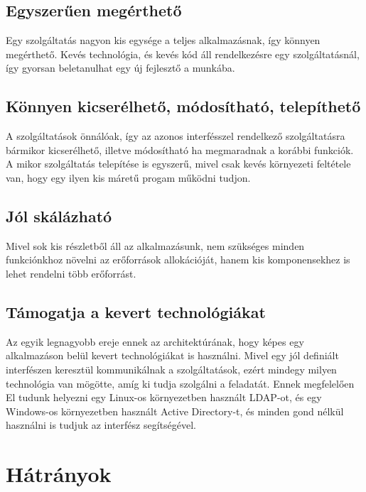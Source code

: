 \documentclass[11pt,magyar,a4paper,oneside,]{report}
\begin{document}
\subsection{Egyszerűen
megérthető}\label{egyszerux171en-meguxe9rthetux151}

Egy szolgáltatás nagyon kis egysége a teljes alkalmazásnak, így könnyen
megérthető. Kevés technológia, és kevés kód áll rendelkezésre egy
szolgáltatásnál, így gyorsan beletanulhat egy új fejlesztő a munkába.

\subsection{Könnyen kicserélhető, módosítható,
telepíthető}\label{kuxf6nnyen-kicseruxe9lhetux151-muxf3dosuxedthatuxf3-telepuxedthetux151}

A szolgáltatások önnálóak, így az azonos interfésszel rendelkező
szolgáltatásra bármikor kicserélhető, illetve módosítható ha megmaradnak
a korábbi funkciók. A mikor szolgáltatás telepítése is egyszerű, mivel
csak kevés környezeti feltétele van, hogy egy ilyen kis máretű progam
működni tudjon.

\subsection{Jól skálázható}\label{juxf3l-skuxe1luxe1zhatuxf3}

Mivel sok kis részletből áll az alkalmazásunk, nem szükséges minden
funkciónkhoz növelni az erőforrások allokációját, hanem kis
komponensekhez is lehet rendelni több erőforrást.

\subsection{Támogatja a kevert
technológiákat}\label{tuxe1mogatja-a-kevert-technoluxf3giuxe1kat}

Az egyik legnagyobb ereje ennek az architektúrának, hogy képes egy
alkalmazáson belül kevert technológiákat is használni. Mivel egy jól
definiált interfészen keresztül kommunikálnak a szolgáltatások, ezért
mindegy milyen technológia van mögötte, amíg ki tudja szolgálni a
feladatát. Ennek megfelelően El tudunk helyezni egy Linux-os
környezetben használt LDAP-ot, és egy Windows-os környezetben használt
Active Directory-t, és minden gond nélkül használni is tudjuk az
interfész segítségével.

\section{\texorpdfstring{Hátrányok
\citep{micro-disadv}}{Hátrányok {[}@micro-disadv{]}}}\label{huxe1truxe1nyok-micro-disadv}
\end{document}
